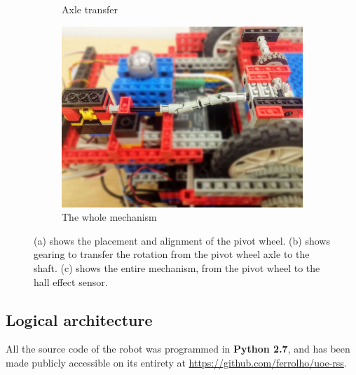 \begin{figure}[ht]
\begin{subfigure}{0.32\textwidth}
        \caption{Axle transfer}
    \end{subfigure}
    \begin{subfigure}{0.32\textwidth}
        \includegraphics[width=\linewidth]{res/robot-pics/pivot-wheel-sensor.jpg}
        \caption{The whole mechanism}
    \end{subfigure}
    \caption{(a) shows the placement and alignment of the pivot wheel. (b) shows gearing to transfer the rotation from the pivot wheel axle to the shaft. (c) shows the entire mechanism, from the pivot wheel to the hall effect sensor.}
    \label{fig:pivot-wheel-system}
\end{figure}


\subsection{Logical architecture}

All the source code of the robot was programmed in \textbf{Python 2.7}, and has been made publicly accessible on its entirety at \url{https://github.com/ferrolho/uoe-rss}.

\bigskip

